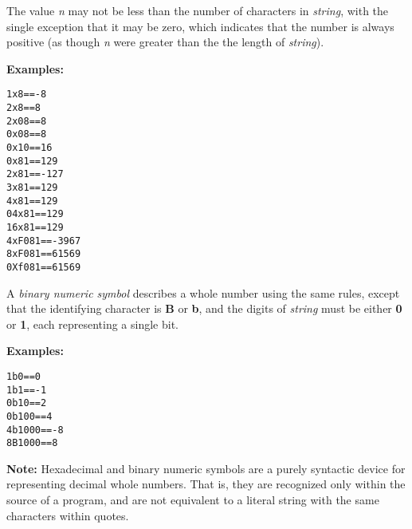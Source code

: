 The value \emph{n} may not be less than the number of characters in
\emph{string}, with the single exception that it may be zero, which
indicates that the number is always positive (as though \emph{n}
were greater than the the length of \emph{string}).
 
\textbf{Examples:}
\begin{alltt}
1x8    == -8
2x8    == 8
2x08   == 8
0x08   == 8
0x10   == 16
0x81   == 129
2x81   == -127
3x81   == 129
4x81   == 129
04x81  == 129
16x81  == 129
4xF081 == -3967
8xF081 == 61569
0Xf081 == 61569
\end{alltt}
 
A \emph{binary numeric symbol} describes a whole number using the
same rules, except that the identifying character is \textbf{B}
or \textbf{b}, and the digits of \emph{string} must be
either \textbf{0} or \textbf{1}, each representing a single bit.
 
\textbf{Examples:}
\begin{alltt}
1b0    == 0
1b1    == -1
0b10   == 2
0b100  == 4
4b1000 == -8
8B1000 == 8
\end{alltt}
\textbf{Note: }Hexadecimal and binary numeric symbols are a purely syntactic
device for representing decimal whole numbers.  That is, they are
recognized only within the source of a \nr{} program, and are not
equivalent to a literal string with the same characters within quotes.
